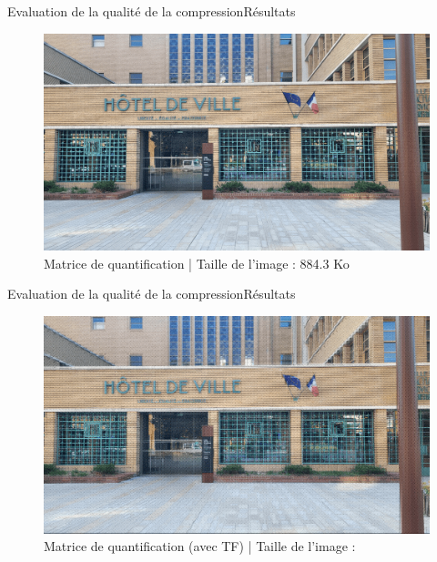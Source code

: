 \begin{frame}{Evaluation de la qualité de la compression}{Résultats}
    \begin{figure}
		\includegraphics[scale=0.32]{images/resultats_compression/mairie_petit_tcd_matrice_finale.png} 
    \caption{Matrice de quantification | Taille de l'image : 884.3 Ko}
    \end{figure}
\end{frame}

\begin{frame}{Evaluation de la qualité de la compression}{Résultats}
  \begin{figure}
  \includegraphics[scale=0.32]{images/resultats_compression/mairie_petit_tf_matrice_finale.png} 
  \caption{Matrice de quantification (avec TF) | Taille de l'image : }
  \end{figure}
\end{frame}


